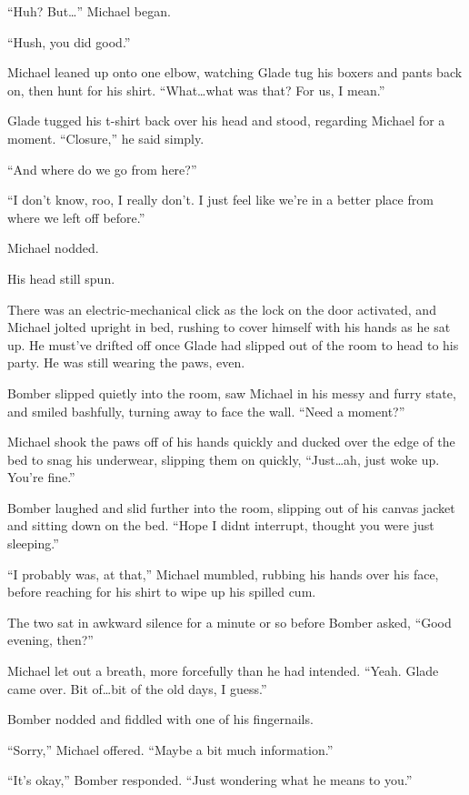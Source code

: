``Huh?  But\ldots{}'' Michael began.

``Hush, you did good.''

Michael leaned up onto one elbow, watching Glade tug his boxers and pants back on, then hunt for his shirt.  ``What\ldots{}what was that?  For us, I mean.''

Glade tugged his t-shirt back over his head and stood, regarding Michael for a moment.  ``Closure,'' he said simply.

``And where do we go from here?''

``I don't know, roo, I really don't.  I just feel like we're in a better place from where we left off before.''

Michael nodded.

His head still spun.

\secdiv

There was an electric-mechanical click as the lock on the door activated, and Michael jolted upright in bed, rushing to cover himself with his hands as he sat up.  He must've drifted off once Glade had slipped out of the room to head to his party.  He was still wearing the paws, even.

Bomber slipped quietly into the room, saw Michael in his messy and furry state, and smiled bashfully, turning away to face the wall.  ``Need a moment?''

Michael shook the paws off of his hands quickly and ducked over the edge of the bed to snag his underwear, slipping them on quickly, ``Just\ldots{}ah, just woke up.  You're fine.''

Bomber laughed and slid further into the room, slipping out of his canvas jacket and sitting down on the bed.  ``Hope I didnt interrupt, thought you were just sleeping.''

``I probably was, at that,'' Michael mumbled, rubbing his hands over his face, before reaching for his shirt to wipe up his spilled cum.

The two sat in awkward silence for a minute or so before Bomber asked, ``Good evening, then?''

Michael let out a breath, more forcefully than he had intended.  ``Yeah.  Glade came over.  Bit of\ldots{}bit of the old days, I guess.''

Bomber nodded and fiddled with one of his fingernails.

``Sorry,'' Michael offered.  ``Maybe a bit much information.''

``It's okay,'' Bomber responded.  ``Just wondering what he means to you.''

